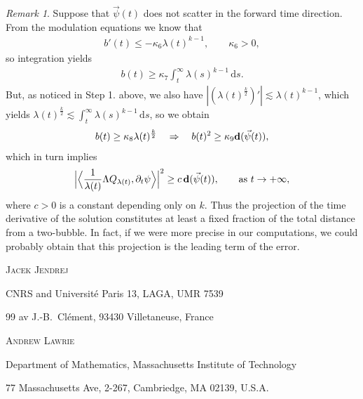 \documentclass[10pt,reqno]{amsart}
\newcommand{\EQ}[1]{\begin{equation}\begin{split} #1 \end{split}\end{equation}}
\numberwithin{equation}{section}
\theoremstyle{remark}
\newtheorem{rem}[thm]{Remark}
\newcommand{\0}{\emptyset}
\newcommand{\bfd}{{\bf d}}
\begin{document}
\begin{rem}
Suppose that $\vec\psi(t)$ does not scatter in the forward time direction.
From the modulation equations we know that
\EQ{
b'(t) \leq -\kappa_6 \lambda(t)^{k-1}, \qquad \kappa_6 > 0,
}
so integration yields
\EQ{
b(t) \geq \kappa_7 \int_t^\infty \lambda(s)^{k-1}\,\mathrm{d}s.
}
But, as noticed in Step 1. above,
we also have $|(\lambda(t)^\frac k2)'| \lesssim \lambda(t)^{k-1}$,
which yields $\lambda(t)^\frac k2 \lesssim \int_t^\infty \lambda(s)^{k-1}\,\mathrm{d}s$,
so we obtain
\EQ{
b(t) \geq \kappa_8 \lambda(t)^\frac k2 \quad \Rightarrow \quad b(t)^2 \geq \kappa_9 \bfd(\vec\psi(t)),
}
which in turn implies
\EQ{
\Big|\Big\langle\frac{1}{\lambda(t)}\Lambda Q_{\lambda(t)}, \partial_t \psi\Big\rangle\Big|^2 \geq c\,\bfd(\vec\psi(t)),\qquad \text{as }t \to +\infty,
}
where $c > 0$ is a constant depending only on $k$.
Thus the projection of the time derivative of the solution constitutes
at least a fixed fraction of the total distance from a two-bubble.
In fact, if we were more precise in our computations, we could probably obtain that
this projection is the leading term of the error.
\end{rem}



\bigskip
\centerline{\scshape Jacek Jendrej}
\smallskip
{\footnotesize
  \centerline{CNRS and Universit\'e Paris 13, LAGA, UMR 7539}
  \centerline{99 av J.-B.~Cl\'ement, 93430 Villetaneuse, France}
  \centerline{}
}

\bigskip

\centerline{\scshape Andrew Lawrie}
\smallskip
{\footnotesize
 \centerline{Department of Mathematics, Massachusetts Institute of Technology}
\centerline{77 Massachusetts Ave, 2-267, Cambriedge, MA 02139, U.S.A.}
\centerline{}
}
\end{document}
